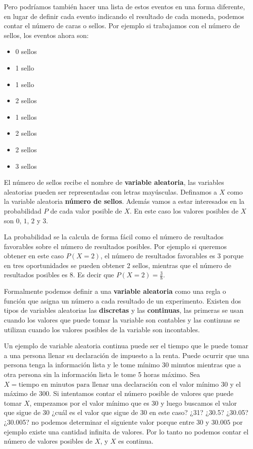 \documentclass[letterpaper,]{book}
\providecommand{\tightlist}{%
  \setlength{\itemsep}{0pt}\setlength{\parskip}{0pt}}
\begin{document}
Pero podríamos también hacer una lista de estos eventos en una forma diferente, en lugar de definir cada evento indicando el resultado de cada moneda, podemos contar el número de caras o sellos. Por ejemplo si trabajamos con el número de sellos, los eventos ahora son:

\begin{itemize}
\tightlist
\item
  0 sellos
\item
  1 sello
\item
  1 sello
\item
  2 sellos
\item
  1 sellos
\item
  2 sellos
\item
  2 sellos
\item
  3 sellos
\end{itemize}

El número de sellos recibe el nombre de \textbf{variable aleatoria}, las variables aleatorias pueden ser representadas con letras mayúsculas. Definamos a \(X\) como la variable aleatoria \textbf{número de sellos}. Además vamos a estar interesados en la probabilidad \(P\) de cada valor posible de \(X\). En este caso los valores posibles de \(X\) son \(0\), \(1\), \(2\) y \(3\).

La probabilidad se la calcula de forma fácil como el número de resultados favorables sobre el número de resultados posibles. Por ejemplo si queremos obtener en este caso \(P\left(X =2 \right)\), el número de resultados favorables es \(3\) porque en tres oportunidades se pueden obtener 2 sellos, mientras que el número de resultados posibles es 8. Es decir que \(P\left(X=2\right)= \frac{3}{8}\).

Formalmente podemos definir a una \textbf{variable aleatoria} como una regla o función que asigna un número a cada resultado de un experimento. Existen dos tipos de variables aleatorias las \textbf{discretas} y las \textbf{continuas}, las primeras se usan cuando los valores que puede tomar la variable son contables y las continuas se utilizan cuando los valores posibles de la variable son incontables.

Un ejemplo de variable aleatoria continua puede ser el tiempo que le puede tomar a una persona llenar su declaración de impuesto a la renta. Puede ocurrir que una persona tenga la información lista y le tome mínimo 30 minutos mientras que a otra persona sin la información lista le tome 5 horas máximo. Sea \(X= \text{tiempo en minutos para llenar una declaración}\) con el valor mínimo 30 y el máximo de 300. Si intentamos contar el número posible de valores que puede tomar \(X\), empezamos por el valor mínimo que es \(30\) y luego buscamos el valor que sigue de \(30\) ¿cuál es el valor que sigue de 30 en este caso? ¿31? ¿30.5? ¿30.05? ¿30.005? no podemos determinar el siguiente valor porque entre \(30\) y \(30.005\) por ejemplo existe una cantidad infinita de valores. Por lo tanto no podemos contar el número de valores posibles de \(X\), y \(X\) es continua.
\end{document}
